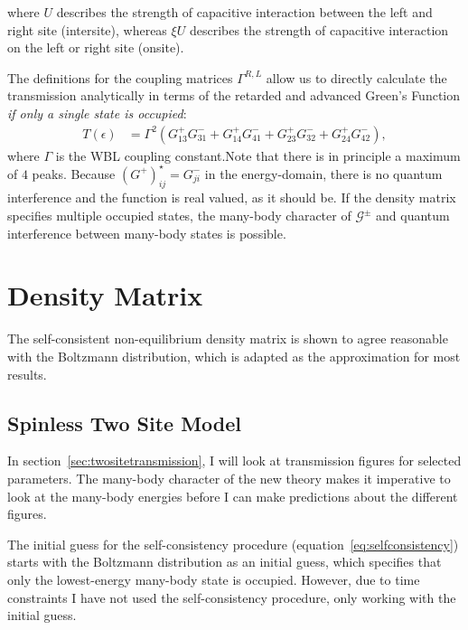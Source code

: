 where $U$ describes the strength of capacitive interaction between the left and right site (intersite), whereas $\xi U$ describes the strength of capacitive interaction on the left or right site (onsite).

The definitions for the coupling matrices $\Gamma^{R,L}$ allow us to directly calculate the transmission analytically in terms of the retarded and advanced Green's Function \emph{if only a single state is occupied}:
\begin{align*}
T(\epsilon) &= \Gamma^2 \left( G^+_{13} G^-_{31} + G^+_{14} G^-_{41} + G^+_{23} G^-_{32} + G^+_{24} G^-_{42} \right),
\end{align*}
where $\Gamma$ is the WBL coupling constant.Note that there is in principle a maximum of $4$ peaks. Because $\left(G^+\right)_{ij}^\star = G^-_{ji}$ in the energy-domain, there is no quantum interference and the function is real valued, as it should be. If the density matrix specifies multiple occupied states, the many-body character of $\mathscr{G}^\pm$ and quantum interference between many-body states is possible.

\section{Density Matrix}
\label{sec:dmapprox}
The self-consistent non-equilibrium density matrix is shown to agree reasonable with the Boltzmann distribution, which is adapted as the approximation for most results.
\subsection{Spinless Two Site Model}
In section~\ref{sec:twositetransmission}, I will look at transmission figures for selected parameters. The many-body character of the new theory makes it imperative to look at the many-body energies before I can make predictions about the different figures.

The initial guess for the self-consistency procedure (equation~\ref{eq:selfconsistency}) starts with the Boltzmann distribution as an initial guess, which specifies that only the lowest-energy many-body state is occupied. However, due to time constraints I have not used the self-consistency procedure, only working with the initial guess.

